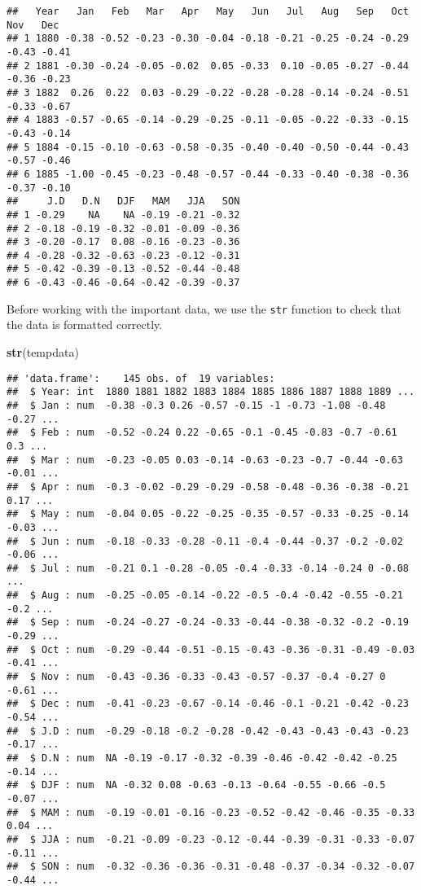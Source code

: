 \documentclass[
]{article}
\newenvironment{Shaded}{\begin{snugshade}}{\end{snugshade}}
\newcommand{\FunctionTok}[1]{\textcolor[rgb]{0.13,0.29,0.53}{\textbf{#1}}}
\newcommand{\NormalTok}[1]{#1}
\begin{document}
\begin{verbatim}
##   Year   Jan   Feb   Mar   Apr   May   Jun   Jul   Aug   Sep   Oct   Nov   Dec
## 1 1880 -0.38 -0.52 -0.23 -0.30 -0.04 -0.18 -0.21 -0.25 -0.24 -0.29 -0.43 -0.41
## 2 1881 -0.30 -0.24 -0.05 -0.02  0.05 -0.33  0.10 -0.05 -0.27 -0.44 -0.36 -0.23
## 3 1882  0.26  0.22  0.03 -0.29 -0.22 -0.28 -0.28 -0.14 -0.24 -0.51 -0.33 -0.67
## 4 1883 -0.57 -0.65 -0.14 -0.29 -0.25 -0.11 -0.05 -0.22 -0.33 -0.15 -0.43 -0.14
## 5 1884 -0.15 -0.10 -0.63 -0.58 -0.35 -0.40 -0.40 -0.50 -0.44 -0.43 -0.57 -0.46
## 6 1885 -1.00 -0.45 -0.23 -0.48 -0.57 -0.44 -0.33 -0.40 -0.38 -0.36 -0.37 -0.10
##     J.D   D.N   DJF   MAM   JJA   SON
## 1 -0.29    NA    NA -0.19 -0.21 -0.32
## 2 -0.18 -0.19 -0.32 -0.01 -0.09 -0.36
## 3 -0.20 -0.17  0.08 -0.16 -0.23 -0.36
## 4 -0.28 -0.32 -0.63 -0.23 -0.12 -0.31
## 5 -0.42 -0.39 -0.13 -0.52 -0.44 -0.48
## 6 -0.43 -0.46 -0.64 -0.42 -0.39 -0.37
\end{verbatim}

Before working with the important data, we use the \texttt{str} function
to check that the data is formatted correctly.

\begin{Shaded}
\begin{Highlighting}[]
\FunctionTok{str}\NormalTok{(tempdata)}
\end{Highlighting}
\end{Shaded}

\begin{verbatim}
## 'data.frame':    145 obs. of  19 variables:
##  $ Year: int  1880 1881 1882 1883 1884 1885 1886 1887 1888 1889 ...
##  $ Jan : num  -0.38 -0.3 0.26 -0.57 -0.15 -1 -0.73 -1.08 -0.48 -0.27 ...
##  $ Feb : num  -0.52 -0.24 0.22 -0.65 -0.1 -0.45 -0.83 -0.7 -0.61 0.3 ...
##  $ Mar : num  -0.23 -0.05 0.03 -0.14 -0.63 -0.23 -0.7 -0.44 -0.63 -0.01 ...
##  $ Apr : num  -0.3 -0.02 -0.29 -0.29 -0.58 -0.48 -0.36 -0.38 -0.21 0.17 ...
##  $ May : num  -0.04 0.05 -0.22 -0.25 -0.35 -0.57 -0.33 -0.25 -0.14 -0.03 ...
##  $ Jun : num  -0.18 -0.33 -0.28 -0.11 -0.4 -0.44 -0.37 -0.2 -0.02 -0.06 ...
##  $ Jul : num  -0.21 0.1 -0.28 -0.05 -0.4 -0.33 -0.14 -0.24 0 -0.08 ...
##  $ Aug : num  -0.25 -0.05 -0.14 -0.22 -0.5 -0.4 -0.42 -0.55 -0.21 -0.2 ...
##  $ Sep : num  -0.24 -0.27 -0.24 -0.33 -0.44 -0.38 -0.32 -0.2 -0.19 -0.29 ...
##  $ Oct : num  -0.29 -0.44 -0.51 -0.15 -0.43 -0.36 -0.31 -0.49 -0.03 -0.41 ...
##  $ Nov : num  -0.43 -0.36 -0.33 -0.43 -0.57 -0.37 -0.4 -0.27 0 -0.61 ...
##  $ Dec : num  -0.41 -0.23 -0.67 -0.14 -0.46 -0.1 -0.21 -0.42 -0.23 -0.54 ...
##  $ J.D : num  -0.29 -0.18 -0.2 -0.28 -0.42 -0.43 -0.43 -0.43 -0.23 -0.17 ...
##  $ D.N : num  NA -0.19 -0.17 -0.32 -0.39 -0.46 -0.42 -0.42 -0.25 -0.14 ...
##  $ DJF : num  NA -0.32 0.08 -0.63 -0.13 -0.64 -0.55 -0.66 -0.5 -0.07 ...
##  $ MAM : num  -0.19 -0.01 -0.16 -0.23 -0.52 -0.42 -0.46 -0.35 -0.33 0.04 ...
##  $ JJA : num  -0.21 -0.09 -0.23 -0.12 -0.44 -0.39 -0.31 -0.33 -0.07 -0.11 ...
##  $ SON : num  -0.32 -0.36 -0.36 -0.31 -0.48 -0.37 -0.34 -0.32 -0.07 -0.44 ...
\end{verbatim}
\end{document}
